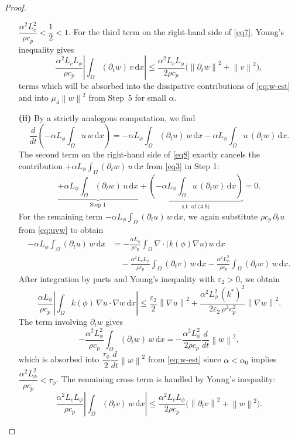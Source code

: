 \documentclass[final,1p,times]{elsarticle}
\newcommand{\dx}{\,\mathrm{d}x}
\numberwithin{equation}{section}
\newcommand{\norm}[1]{\left\|#1\right\|}
\newcommand{\abs}[1]{\left|#1\right|}
\newcommand{\ptn}{\partial_t}
\begin{document}
\begin{proof}
\begin{itemize}
			$\dfrac{\alpha^2 L_c^2}{\rho c_p} < \dfrac{1}{2} < 1$.
			For the third term on the right-hand side of \eqref{eq7}, Young's inequality gives
			\[
			\frac{\alpha^2 L_c L_\phi}{\rho c_p}
			\abs{\int_\Omega (\ptn w)\,v\dx}
			\leq
			\frac{\alpha^2 L_c L_\phi}{2\rho c_p}
			\bigl(\norm{\ptn w}^2 + \norm{v}^2\bigr),
			\]
			terms which will be absorbed into the dissipative contributions of
			\eqref{eq:w-est} and into $\mu_4\norm{w}^2$ from Step~5 for small $\alpha$.
			\item[\textbf{(ii)}]
			By a strictly analogous computation, we find
			\begin{equation}
				\label{eq8}
				\frac{d}{dt}\!\left(-\alpha L_\phi\int_\Omega u\,w\dx\right)
				= -\alpha L_\phi\int_\Omega (\ptn u)\,w\dx
				-\alpha L_\phi\int_\Omega u\,(\ptn w)\dx.
			\end{equation}
			The second term on the right-hand side of \eqref{eq8} exactly cancels the contribution
			$+\alpha L_\phi\int_\Omega (\ptn w)\,u\dx$ from \eqref{eq3} in Step 1:
			\[
			\underbrace{+\alpha L_\phi\int_\Omega (\ptn w)\,u\dx}_{\text{Step 1}}
			+
			\underbrace{\left( -\alpha L_\phi\int_\Omega u\,(\ptn w)\dx \right)}_{\text{s.t. of (4.8)}}
			= 0.
			\]
			For the remaining term $-\alpha L_\phi\int_\Omega (\ptn u)\,w\dx$,
			we again substitute $\rho c_p\,\ptn u$ from \eqref{eq:uvw} to obtain
			\begin{align*}
				-\alpha L_\phi\int_\Omega (\ptn u)\,w\dx
				&= -\frac{\alpha L_\phi}{\rho c_p}
				\int_\Omega \nabla\cdot\bigl(k(\phi)\nabla u\bigr)\,w\dx \\
				&\quad
				-\frac{\alpha^2 L_c L_\phi}{\rho c_p}
				\int_\Omega (\ptn v)\,w\dx
				-\frac{\alpha^2 L_\phi^2}{\rho c_p}
				\int_\Omega (\ptn w)\,w\dx.
			\end{align*}
			After integration by parts and Young's inequality with
			$\varepsilon_2 > 0$, we obtain
			\[
			\frac{\alpha L_\phi}{\rho c_p}
			\abs{\int_\Omega k(\phi)\,\nabla u\cdot\nabla w\dx}
			\leq
			\frac{\varepsilon_2}{2}\norm{\nabla u}^2
			+\frac{\alpha^2 L_\phi^2\,(k^*)^2}{2\varepsilon_2\,\rho^2 c_p^2}
			\norm{\nabla w}^2.
			\]
			The term involving $\ptn w$ gives
			\[
			-\frac{\alpha^2 L_\phi^2}{\rho c_p}
			\int_\Omega (\ptn w)\,w\dx
			= -\frac{\alpha^2 L_\phi^2}{2\rho c_p}\frac{d}{dt}\norm{w}^2,
			\]
			which is absorbed into $\dfrac{\tau_\phi}{2}\dfrac{d}{dt}\norm{w}^2$ from
			\eqref{eq:w-est} since $\alpha < \alpha_0$ implies
			$\dfrac{\alpha^2 L_\phi^2}{\rho c_p} < \tau_\phi$.
			The remaining cross term is handled by Young's inequality:
			\[
			\frac{\alpha^2 L_c L_\phi}{\rho c_p}
			\abs{\int_\Omega (\ptn v)\,w\dx}
			\leq
			\frac{\alpha^2 L_c L_\phi}{2\rho c_p}
			\bigl(\norm{\ptn v}^2 + \norm{w}^2\bigr).
			\]
			

\end{itemize}
\end{proof}
\end{document}
